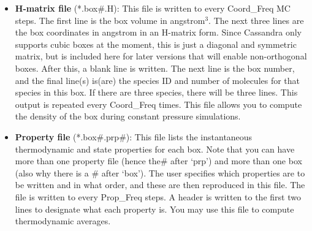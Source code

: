 \begin{itemize}
\item {\bf H-matrix file} (*.box\#.H): This file is written to every Coord\_Freq MC steps. The first line is the box volume in angstrom$^3$. The next three lines are the box coordinates in angstrom in an H-matrix form. Since Cassandra only supports cubic boxes at the moment, this is just a diagonal and symmetric matrix, but is included here for later versions that will enable non-orthogonal boxes. After this, a blank line is written. The next line is the box number, and the final line(s) is(are) the species ID and number of molecules for that species in this box. If there are three species, there will be three lines. This output is repeated every Coord\_Freq times. This file allows you to compute the density of the box during constant pressure simulations.  


\item{{\bf Property file}} (*.box\#.prp\#): This file lists the instantaneous thermodynamic and state properties for each box. Note that you can have more than one property file (hence the\# after `prp') and more than one box (also why there is a \# after `box'). The user specifies which properties are to be written and in what order, and these are then reproduced in this file. The file is written to every Prop\_Freq steps. A header is written to the first two lines to designate what each property is. You may use this file to compute thermodynamic averages.

\end{itemize}
